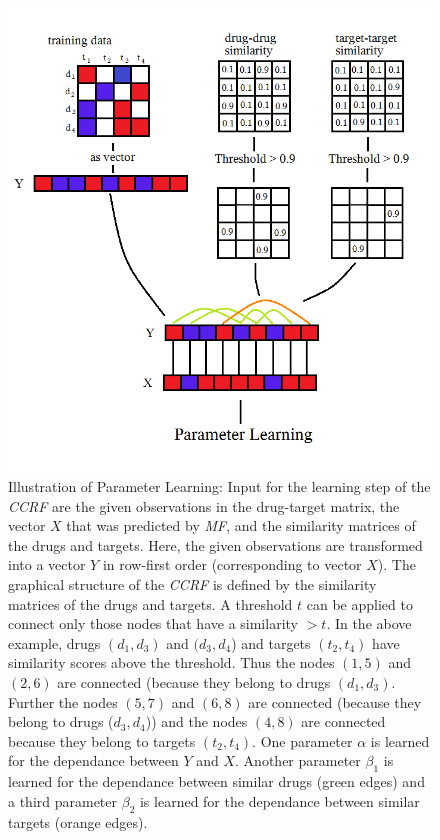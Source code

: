 \begin{figure}
\begin{center}
\includegraphics[scale=0.6]{ccrf_input.png}
\end{center}
\caption[Illustration of Parameter Learning]{\large{Illustration of Parameter Learning: Input for the learning step of the \textit{CCRF} are the given observations in the drug-target matrix, the vector $X$ that was predicted by \textit{MF}, and the similarity matrices of the drugs and targets. Here, the given observations are transformed into a vector $Y$ in row-first order (corresponding to vector $X$). The graphical structure of the \textit{CCRF} is defined by the similarity matrices of the drugs and targets. A threshold $t$ can be applied to connect only those nodes that have a similarity $>t$. In the above example, drugs $(d_1, d_3)$ and $(d_3, d_4$) and targets $(t_2, t_4)$ have similarity scores above the threshold. Thus the nodes $(1,5)$ and $(2,6)$ are connected (because they belong to drugs $(d_1, d_3)$. Further the nodes $(5,7)$ and $(6,8)$ are connected (because they belong to drugs ($d_3, d_4$)) and the nodes $(4,8)$ are connected because they belong to targets $(t_2, t_4)$. One parameter $\alpha$ is learned for the dependance between $Y$ and $X$. Another parameter $\beta_1$ is learned for the dependance between similar drugs (green edges) and a third parameter $\beta_2$ is learned for the dependance between similar targets (orange edges).}}
\label{fig:ccrf_param_learn}
\end{figure}



